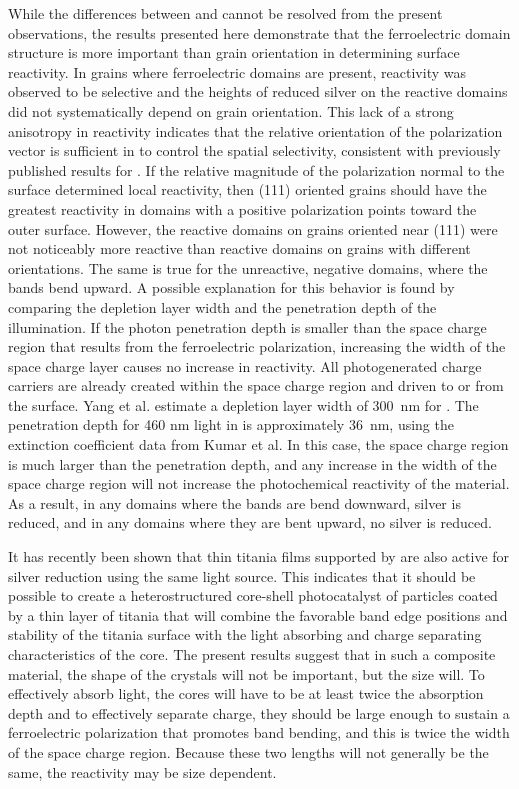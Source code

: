While the differences between  and  cannot be resolved from the
present observations, the results presented here demonstrate that the ferroelectric domain
structure is more important than grain orientation in determining surface reactivity. In
grains where ferroelectric domains are present, reactivity was observed to be selective
and the heights of reduced silver on the reactive domains did not systematically depend on
grain orientation. This lack of a strong anisotropy in reactivity indicates that the
relative orientation of the polarization vector is sufficient in  to control
the spatial selectivity, consistent with previously published results for
.\cite{Burbure:2010tt} If the relative magnitude of the polarization normal to
the surface determined local reactivity, then (111) oriented  grains should
have the greatest reactivity in domains with a positive polarization points toward the
outer surface. However, the reactive domains on grains oriented near (111) were not
noticeably more reactive than reactive domains on grains with different orientations. The
same is true for the unreactive, negative domains, where the bands bend upward. A possible
explanation for this behavior is found by comparing the depletion layer width and the
penetration depth of the illumination. If the photon penetration depth is smaller than the
space charge region that results from the ferroelectric polarization, increasing the width
of the space charge layer causes no increase in reactivity. All photogenerated charge
carriers are already created within the space charge region and driven to or from the
surface. Yang et al.\cite{Yang:2009hl} estimate a depletion layer width of
\SI{300}{\nano\meter} for . The penetration depth for 460 nm light in
 is approximately \SI{36}{\nano\meter}, using the extinction coefficient data
from Kumar et al. \cite{Kumar:2008fr} In this case, the space charge region is much larger
than the penetration depth, and any increase in the width of the space charge region will
not increase the photochemical reactivity of the material. As a result, in any domains
where the bands are bend downward, silver is reduced, and in any domains where they are
bent upward, no silver is reduced.

It has recently been shown that thin titania films supported by  are also
active for silver reduction using the same light source.\cite{Zhang:2011cj} This indicates
that it should be possible to create a heterostructured core-shell photocatalyst of
 particles coated by a thin layer of titania that will combine the favorable
band edge positions and stability of the titania surface with the light absorbing and
charge separating characteristics of the  core. The present results suggest
that in such a composite material, the shape of the  crystals will not be
important, but the size will. To effectively absorb light, the cores will have to be at
least twice the absorption depth and to effectively separate charge, they should be large
enough to sustain a ferroelectric polarization that promotes band bending, and this is
twice the width of the space charge region. Because these two lengths will not generally
be the same, the reactivity may be size dependent.

